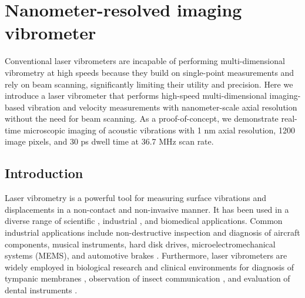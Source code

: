 \chapter{Nanometer-resolved imaging vibrometer}
\label{chp:APL2011_Chapter}

Conventional laser vibrometers are incapable of performing multi-dimensional vibrometry at high speeds because they build on single-point measurements and rely on beam scanning, significantly limiting their utility and precision. Here we introduce a laser vibrometer that performs high-speed multi-dimensional imaging-based vibration and velocity measurements with nanometer-scale axial resolution without the need for beam scanning. As a proof-of-concept, we demonstrate real-time microscopic imaging of acoustic vibrations with 1 nm axial resolution, 1200 image pixels, and 30 ps dwell time at 36.7 MHz scan rate.

\section{Introduction}

Laser vibrometry is a powerful tool for measuring surface vibrations and displacements in a non-contact and non-invasive manner. It has been used in a diverse range of scientific \cite{castellini2006laser,broch1980mechanical}, industrial \cite{castellini2006laser,broch1980mechanical,drain1980laser,arnott1990laser}, and biomedical \cite{castellini2006laser,drain1980laser,goode1996laser,huber2001evaluation} applications. Common industrial applications include non-destructive inspection and diagnosis of aircraft components, musical instruments, hard disk drives, microelectromechanical systems (MEMS), and automotive brakes \cite{castellini2006laser,broch1980mechanical,drain1980laser}. Furthermore, laser vibrometers are widely employed in biological research and clinical environments for diagnosis of tympanic membranes \cite{goode1996laser,huber2001evaluation}, observation of insect communication \cite{castellini2006laser,drain1980laser}, and evaluation of dental instruments \cite{castellini2006laser,drain1980laser}.

